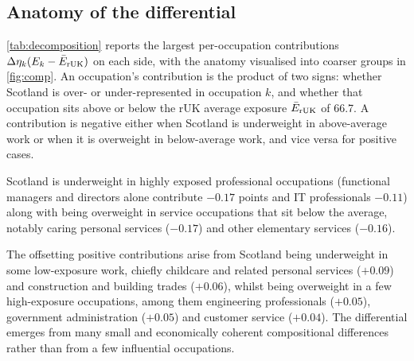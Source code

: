  
\subsection{Anatomy of the differential}\label{sec:anatomy}

\cref{tab:decomposition} reports the largest per-occupation contributions $\Delta\eta_k (E_k - \bar{E}_{\mathrm{rUK}})$ on each side, with the anatomy visualised into coarser groups in \cref{fig:comp}. An occupation's contribution is the product of two signs: whether Scotland is over- or under-represented in occupation $k$, and whether that occupation sits above or below the rUK average exposure $\bar{E}_{\mathrm{rUK}}$ of 66.7. A contribution is negative either when Scotland is underweight in above-average work or when it is overweight in below-average work, and vice versa for positive cases.

Scotland is underweight in highly exposed professional occupations (functional managers and directors alone contribute $-0.17$ points and IT professionals $-0.11$) along with being overweight in service occupations that sit below the average, notably caring personal services ($-0.17$) and other elementary services ($-0.16$). 

The offsetting positive contributions arise from Scotland being underweight in some low-exposure work, chiefly childcare and related personal services ($+0.09$) and construction and building trades ($+0.06$), whilst being overweight in a few high-exposure occupations, among them engineering professionals ($+0.05$), government administration ($+0.05$) and customer service ($+0.04$). The differential emerges from many small and economically coherent compositional differences rather than from a few influential occupations.

